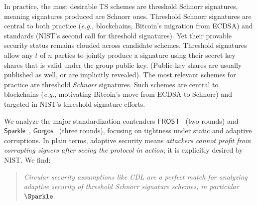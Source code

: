In practice, the most desirable TS schemes are threshold Schnorr signatures, meaning signatures produced are Schnorr ones. 
Threshold Schnorr signatures are central to both practice (\emph{e.g.}, blockchains, Bitcoin’s migration from ECDSA) and standards (NIST’s second call for threshold signatures). Yet their provable security status remains clouded across candidate schemes.
\fi
Threshold signatures allow any $t$ of $n$ parties to jointly produce a signature using their secret key shares that is valid under the group public key. (Public-key shares are usually published as well, or are implicitly revealed). The most relevant  schemes for practice are threshold \emph{Schnorr} signatures. Such schemes are  central to blockchains (\emph{e.g.}, motivating Bitcoin’s move from ECDSA to Schnorr) and targeted in NIST’s threshold signature efforts.


We analyze  the major standardization contenders $\mathsf{FROST}$~\cite{SAC:GolKom20,rfc9591} (two rounds) and $\mathsf{Sparkle}$~\cite{C:CriKomMal23}, $\mathsf{Gorgos}$~\cite{C:BDLR25} (three rounds), focusing on tightness under static and adaptive corruptions.  In plain terms, adaptive security means \emph{attackers cannot profit from corrupting signers after seeing the protocol in action}; it is explicitly desired by NIST. We  find:
\begin{quote}
  \emph{Circular security assumptions like CDL are a perfect match for analyzing adaptive security of threshold Schnorr signature schemes,  in particular $\Sparkle$.}
     \end{quote}
\noindent   
 
